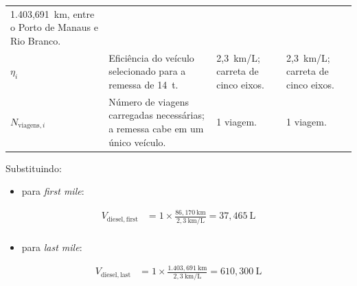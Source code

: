 \documentclass[brazil,]{article}
\begin{document}
\begin{longtable}[]{@{}llll@{}}
\begin{minipage}[t]{0.24\columnwidth}
1.403,691~km, entre o Porto de Manaus e Rio Branco.\strut
\end{minipage}\tabularnewline
\begin{minipage}[t]{0.16\columnwidth}\raggedright
\(\eta_i\)\strut
\end{minipage} & \begin{minipage}[t]{0.27\columnwidth}\raggedright
Eficiência do veículo selecionado para a remessa de 14~t.\strut
\end{minipage} & \begin{minipage}[t]{0.24\columnwidth}\raggedright
2,3~km/L; carreta de cinco eixos.\strut
\end{minipage} & \begin{minipage}[t]{0.24\columnwidth}\raggedright
2,3~km/L; carreta de cinco eixos.\strut
\end{minipage}\tabularnewline
\begin{minipage}[t]{0.16\columnwidth}\raggedright
\(N_{\mathrm{viagens},i}\)\strut
\end{minipage} & \begin{minipage}[t]{0.27\columnwidth}\raggedright
Número de viagens carregadas necessárias; a remessa cabe em um único
veículo.\strut
\end{minipage} & \begin{minipage}[t]{0.24\columnwidth}\raggedright
1 viagem.\strut
\end{minipage} & \begin{minipage}[t]{0.24\columnwidth}\raggedright
1 viagem.\strut
\end{minipage}\tabularnewline
\bottomrule
\end{longtable}

Substituindo:

\begin{itemize}
\item
  para \emph{first mile}:
\end{itemize}

\[
\begin{aligned}
V_{\mathrm{diesel,first}}
&=1\times\frac{86{,}170\ \mathrm{km}}{2{,}3\ \mathrm{km/L}}
=37{,}465\ \mathrm{L}\\
\end{aligned}
\]

\begin{itemize}
\item
  para \emph{last mile}:
\end{itemize}

\[
\begin{aligned}
V_{\mathrm{diesel,last}}
&=1\times\frac{1.403{,}691\ \mathrm{km}}{2{,}3\ \mathrm{km/L}}
=610{,}300\ \mathrm{L}
\end{aligned}
\]
\end{document}
